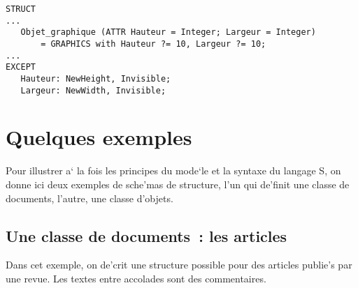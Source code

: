 {\begin{example}
\begin{verbatim}
STRUCT
...
   Objet_graphique (ATTR Hauteur = Integer; Largeur = Integer)
       = GRAPHICS with Hauteur ?= 10, Largeur ?= 10;
...
EXCEPT
   Hauteur: NewHeight, Invisible;
   Largeur: NewWidth, Invisible;
\end{verbatim}
\end{example}

\section{Quelques exemples}

Pour illustrer a` la fois les principes du mode`le et la syntaxe du langage S,
on donne ici deux exemples de sche'mas de structure, l'un qui de'finit une
classe de documents, l'autre, une classe d'objets.

\subsection{Une classe de documents~: les articles}

Dans cet exemple, on de'crit une structure possible pour des articles
publie's par une revue. Les textes entre accolades sont des commentaires.

}
